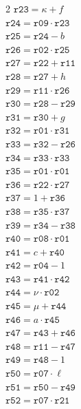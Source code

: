 \documentclass[10pt]{article}
\begin{document}
\begin{multicols}{2}
\(\mathtt{r23} = \kappa + f\)\\
\(\mathtt{r24} = \mathtt{r09} \cdot \mathtt{r23}\)\\
\(\mathtt{r25} = \mathtt{r24} - b\)\\
\(\mathtt{r26} = \mathtt{r02} \cdot \mathtt{r25}\)\\
\(\mathtt{r27} = \mathtt{r22} + \mathtt{r11}\)\\
\(\mathtt{r28} = \mathtt{r27} + h\)\\
\(\mathtt{r29} = \mathtt{r11} \cdot \mathtt{r26}\)\\
\(\mathtt{r30} = \mathtt{r28} - \mathtt{r29}\)\\
\(\mathtt{r31} = \mathtt{r30} + g\)\\
\(\mathtt{r32} = \mathtt{r01} \cdot \mathtt{r31}\)\\
\(\mathtt{r33} = \mathtt{r32} - \mathtt{r26}\)\\
\(\mathtt{r34} = \mathtt{r33} \cdot \mathtt{r33}\)\\
\(\mathtt{r35} = \mathtt{r01} \cdot \mathtt{r01}\)\\
\(\mathtt{r36} = \mathtt{r22} \cdot \mathtt{r27}\)\\
\(\mathtt{r37} = 1 + \mathtt{r36}\)\\
\(\mathtt{r38} = \mathtt{r35} \cdot \mathtt{r37}\)\\
\(\mathtt{r39} = \mathtt{r34} - \mathtt{r38}\)\\
\(\mathtt{r40} = \mathtt{r08} \cdot \mathtt{r01}\)\\
\(\mathtt{r41} = c + \mathtt{r40}\)\\
\(\mathtt{r42} = \mathtt{r04} - 1\)\\
\(\mathtt{r43} = \mathtt{r41} \cdot \mathtt{r42}\)\\
\(\mathtt{r44} = \nu \cdot \mathtt{r02}\)\\
\(\mathtt{r45} = \mu + \mathtt{r44}\)\\
\columnbreak
\(\mathtt{r46} = a \cdot \mathtt{r45}\)\\
\(\mathtt{r47} = \mathtt{r43} + \mathtt{r46}\)\\
\(\mathtt{r48} = \mathtt{r11} - \mathtt{r47}\)\\
\(\mathtt{r49} = \mathtt{r48} - 1\)\\
\(\mathtt{r50} = \mathtt{r07} \cdot \ell\)\\
\(\mathtt{r51} = \mathtt{r50} - \mathtt{r49}\)\\
\(\mathtt{r52} = \mathtt{r07} \cdot \mathtt{r21}\)\\

\end{multicols}
\end{document}
